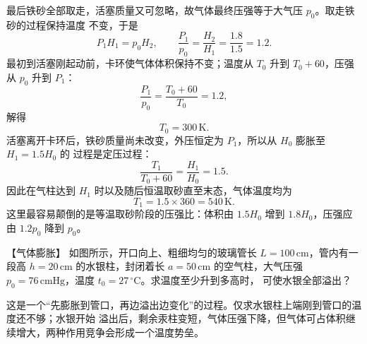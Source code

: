 {\begin{xesolution}
最后铁砂全部取走，活塞质量又可忽略，故气体最终压强等于大气压 $p_0$。取走铁砂的过程保持温度
不变，于是
\begin{equation}
  P_1H_1=p_0H_2,\qquad
  \frac{P_1}{p_0}=\frac{H_2}{H_1}=\frac{1.8}{1.5}=1.2.
\end{equation}
最初到活塞刚起动前，卡环使气体体积保持不变；温度从 $T_0$ 升到 $T_0+60$，压强从 $p_0$ 升到
$P_1$：
\begin{equation}
  \frac{P_1}{p_0}=\frac{T_0+60}{T_0}=1.2,
\end{equation}
解得
\begin{equation}
  \boxed{T_0=300\,\mathrm K}.
\end{equation}
活塞离开卡环后，铁砂质量尚未改变，外压恒定为 $P_1$，所以从 $H_0$ 膨胀至 $H_1=1.5H_0$ 的
过程是定压过程：
\begin{equation}
  \frac{T_1}{T_0+60}=\frac{H_1}{H_0}=1.5.
\end{equation}
因此在气柱达到 $H_1$ 时以及随后恒温取砂直至末态，气体温度均为
\begin{equation}
  \boxed{T_1=1.5\times360=540\,\mathrm K}.
\end{equation}
这里最容易颠倒的是等温取砂阶段的压强比：体积由 $1.5H_0$ 增到 $1.8H_0$，压强应由 $1.2p_0$
降到 $p_0$。
\end{xesolution}

\begin{origexamplebox}{【气体膨胀】}\label{ch14:ex:s28-19-8}
如图所示，开口向上、粗细均匀的玻璃管长 $L=100\,\mathrm{cm}$，管内有一段高
$h=20\,\mathrm{cm}$ 的水银柱，封闭着长 $a=50\,\mathrm{cm}$ 的空气柱，大气压强
$p_0=76\,\mathrm{cmHg}$，温度 $t_0=27\,{}^\circ\mathrm C$。求温度至少升到多高时，
可使水银全部溢出？
\figureNineteenEightFaithful
\end{origexamplebox}

\begin{xesolution}
这是一个“先膨胀到管口，再边溢出边变化”的过程。仅求水银柱上端刚到管口的温度还不够；水银开始
溢出后，剩余汞柱变短，气体压强下降，但气体可占体积继续增大，两种作用竞争会形成一个温度势垒。

\mercurySpillDiagram


\end{xesolution}}
